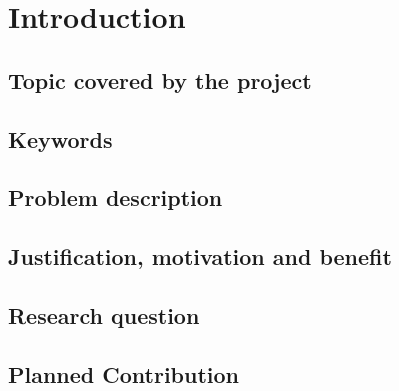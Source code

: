 \chapter{Introduction}
\label{chap:introduction}

\section{Topic covered by the project}

\section{Keywords}

\section{Problem description}
\label{sec:ProblemDescription}
  





\section{Justification, motivation and benefit}
\section{Research question}

\section{Planned Contribution}

